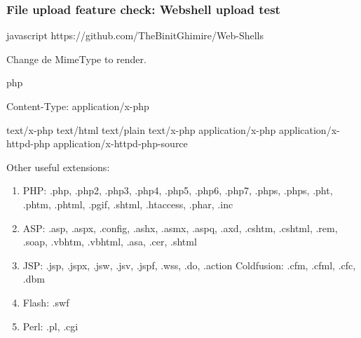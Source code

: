 \documentclass[letterpaper,12pt]{extarticle}
\begin{document}
\subsubsection{File upload feature check: Webshell upload test}

\begin{sourcecode}{javascript}
https://github.com/TheBinitGhimire/Web-Shells
\end{sourcecode}



Change de MimeType to render.

\begin{sourcecode}{php}

Content-Type: application/x-php

text/x-php
text/html
text/plain
text/x-php
application/x-php
application/x-httpd-php
application/x-httpd-php-source

\end{sourcecode}


Other useful extensions:

\begin{enumerate}
    \item PHP: .php, .php2, .php3, .php4, .php5, .php6, .php7, .phps, .phps, .pht, .phtm, .phtml, .pgif, .shtml, .htaccess, .phar, .inc
    \item ASP: .asp, .aspx, .config, .ashx, .asmx, .aspq, .axd, .cshtm, .cshtml, .rem, .soap, .vbhtm, .vbhtml, .asa, .cer, .shtml
    \item JSP: .jsp, .jspx, .jsw, .jsv, .jspf, .wss, .do, .action Coldfusion: .cfm, .cfml, .cfc, .dbm
    \item Flash: .swf
    \item Perl: .pl, .cgi
\end{enumerate}
 
\end{document}
